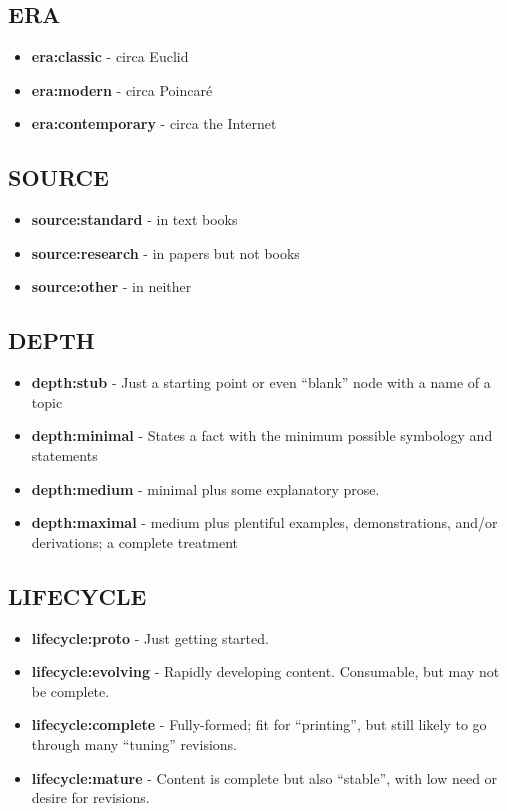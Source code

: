 \documentclass[12pt]{article}
\begin{document}
\subsection*{ERA}

\begin{itemize}
\item {\bf era:classic} - circa Euclid
\item {\bf era:modern} - circa Poincar\'e
\item {\bf era:contemporary} - circa the Internet
\end{itemize}

\subsection*{SOURCE}

\begin{itemize}
\item {\bf source:standard} - in text books
\item {\bf source:research} - in papers but not books
\item {\bf source:other} - in neither
\end{itemize}

\subsection*{DEPTH}

\begin{itemize}
\item {\bf depth:stub} - Just a starting point or even ``blank'' node with a name of a topic
\item {\bf depth:minimal} - States a fact with the minimum possible symbology and statements
\item {\bf depth:medium} - minimal plus some explanatory prose.
\item {\bf depth:maximal} - medium plus plentiful examples, demonstrations, and/or derivations; a complete treatment
\end{itemize}

\subsection*{LIFECYCLE}

\begin{itemize}
\item {\bf lifecycle:proto} - Just getting started.
\item {\bf lifecycle:evolving} - Rapidly developing content. Consumable, but may not be complete.
\item {\bf lifecycle:complete} - Fully-formed; fit for ``printing'', but still likely to go through many ``tuning'' revisions.
\item {\bf lifecycle:mature} - Content is complete but also ``stable'', with low need or desire for revisions.
\end{itemize}
\end{document}

